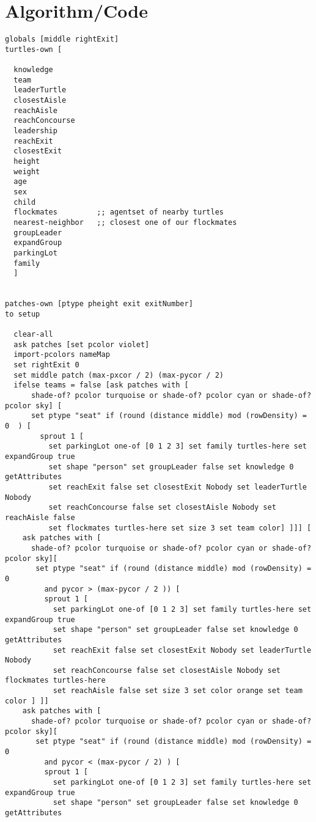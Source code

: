 \documentclass{article}
\begin{document}
\section{Algorithm/Code}
\lstset{breaklines=true, language=Lisp}
\begin{lstlisting}
globals [middle rightExit]
turtles-own [
  
  knowledge 
  team 
  leaderTurtle 
  closestAisle 
  reachAisle 
  reachConcourse 
  leadership 
  reachExit 
  closestExit 
  height 
  weight 
  age 
  sex 
  child
  flockmates         ;; agentset of nearby turtles
  nearest-neighbor   ;; closest one of our flockmates
  groupLeader
  expandGroup
  parkingLot
  family
  ]


patches-own [ptype pheight exit exitNumber]
to setup 
  
  clear-all
  ask patches [set pcolor violet]
  import-pcolors nameMap
  set rightExit 0
  set middle patch (max-pxcor / 2) (max-pycor / 2)
  ifelse teams = false [ask patches with [
      shade-of? pcolor turquoise or shade-of? pcolor cyan or shade-of? pcolor sky] [
      set ptype "seat" if (round (distance middle) mod (rowDensity) = 0  ) [
        sprout 1 [ 
          set parkingLot one-of [0 1 2 3] set family turtles-here set expandGroup true 
          set shape "person" set groupLeader false set knowledge 0 getAttributes  
          set reachExit false set closestExit Nobody set leaderTurtle Nobody 
          set reachConcourse false set closestAisle Nobody set reachAisle false 
          set flockmates turtles-here set size 3 set team color] ]]] [
    ask patches with [
      shade-of? pcolor turquoise or shade-of? pcolor cyan or shade-of? pcolor sky][
       set ptype "seat" if (round (distance middle) mod (rowDensity) = 0 
         and pycor > (max-pycor / 2 )) [
         sprout 1 [
           set parkingLot one-of [0 1 2 3] set family turtles-here set expandGroup true 
           set shape "person" set groupLeader false set knowledge 0 getAttributes 
           set reachExit false set closestExit Nobody set leaderTurtle Nobody 
           set reachConcourse false set closestAisle Nobody set flockmates turtles-here 
           set reachAisle false set size 3 set color orange set team color ] ]]
    ask patches with [
      shade-of? pcolor turquoise or shade-of? pcolor cyan or shade-of? pcolor sky][
       set ptype "seat" if (round (distance middle) mod (rowDensity) = 0 
         and pycor < (max-pycor / 2) ) [
         sprout 1 [ 
           set parkingLot one-of [0 1 2 3] set family turtles-here set expandGroup true 
           set shape "person" set groupLeader false set knowledge 0 getAttributes 

\end{lstlisting}
\end{document}
